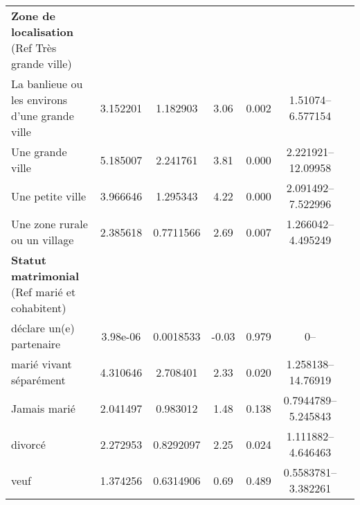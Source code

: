\documentclass[a4paper]{article}
\begin{document}
\begin{table}[ht]
\begin{tabular}{lcccccc}
		\textbf{Zone de localisation} (Ref Très grande ville) & & & & & \\
		\quad La banlieue ou les environs d'une grande ville & 3.152201 & 1.182903 & 3.06 & 0.002 & 1.51074--6.577154 \\
		\quad Une grande ville & 5.185007 & 2.241761 & 3.81 & 0.000 & 2.221921--12.09958 \\
		\quad Une petite ville & 3.966646 & 1.295343 & 4.22 & 0.000 & 2.091492--7.522996 \\
		\quad Une zone rurale ou un village & 2.385618 & 0.7711566 & 2.69 & 0.007 & 1.266042--4.495249 \\
		\textbf{Statut matrimonial} (Ref marié et cohabitent) & & & & & \\
		\quad déclare un(e) partenaire & 3.98e-06 & 0.0018533 & -0.03 & 0.979 & 0-- \\
		\quad marié vivant séparément & 4.310646 & 2.708401 & 2.33 & 0.020 & 1.258138--14.76919 \\
		\quad Jamais marié & 2.041497 & 0.983012 & 1.48 & 0.138 & 0.7944789--5.245843 \\
		\quad divorcé & 2.272953 & 0.8292097 & 2.25 & 0.024 & 1.111882--4.646463 \\
		\quad veuf & 1.374256 & 0.6314906 & 0.69 & 0.489 & 0.5583781--3.382261 \\
		\bottomrule
	\end{tabular}
\end{table}
\end{document}
